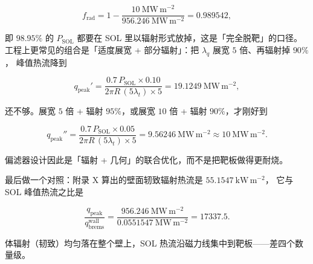 \begin{equation}
f_{\mathrm{rad}}=1-\frac{10\ \mathrm{MW\,m^{-2}}}{956.246\ \mathrm{MW\,m^{-2}}}
=0.989542,
\label{eq:app-ad-detach}
\end{equation}

即 $98.95\%$ 的 $P_{\mathrm{SOL}}$ 都要在 SOL 里以辐射形式放掉，这是「完全脱靶」的口径。
工程上更常见的组合是「适度展宽 + 部分辐射」：把 $\lambda_q$ 展宽 $5$ 倍、再辐射掉 $90\%$，
峰值热流降到

\begin{equation}
q_{\mathrm{peak}}'=\frac{0.7\,P_{\mathrm{SOL}}\times0.10}
{2\pi R\,(5\lambda_t)\times5}=19.1249\ \mathrm{MW\,m^{-2}},
\label{eq:app-ad-broaden}
\end{equation}

还不够。展宽 $5$ 倍 + 辐射 $95\%$，或展宽 $10$ 倍 + 辐射 $90\%$，才刚好到

\begin{equation}
q_{\mathrm{peak}}''=\frac{0.7\,P_{\mathrm{SOL}}\times0.05}{2\pi R\,(5\lambda_t)\times5}
=9.56246\ \mathrm{MW\,m^{-2}}\approx10\ \mathrm{MW\,m^{-2}} .
\label{eq:app-ad-broaden2}
\end{equation}

偏滤器设计因此是「辐射 + 几何」的联合优化，而不是把靶板做得更耐烧。

最后做一个对照：附录 X 算出的壁面轫致辐射热流是 $55.1547\ \mathrm{kW\,m^{-2}}$，
它与 SOL 峰值热流之比是

\begin{equation}
\frac{q_{\mathrm{peak}}}{q_{\mathrm{brems}}^{\mathrm{wall}}}
=\frac{956.246\ \mathrm{MW\,m^{-2}}}{0.0551547\ \mathrm{MW\,m^{-2}}}=17337.5 .
\label{eq:app-ad-ratio}
\end{equation}

体辐射（韧致）均匀落在整个壁上，SOL 热流沿磁力线集中到靶板——差四个数量级。

